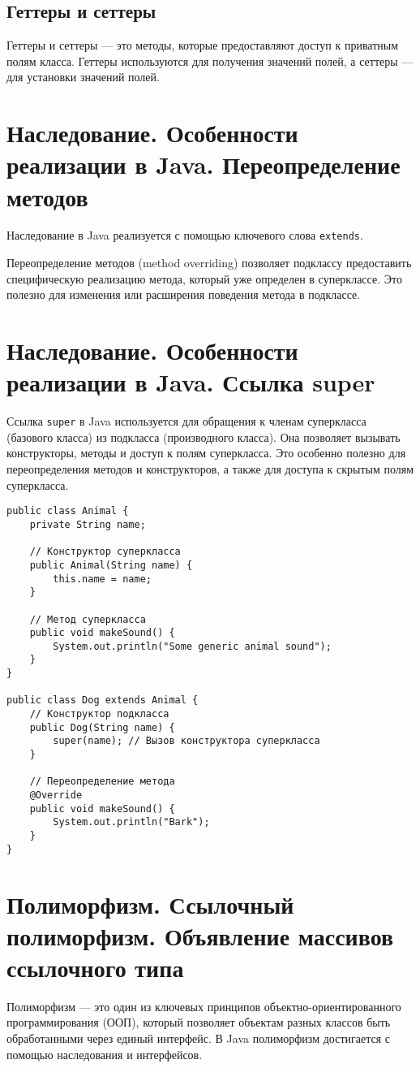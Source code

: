 \documentclass[12pt, a4paper]{article}
\begin{document}
\subsection*{Геттеры и сеттеры}
Геттеры и сеттеры — это методы, которые предоставляют доступ к приватным полям класса. Геттеры используются для получения значений полей, а сеттеры — для установки значений полей.


\section{Наследование. Особенности реализации в Java. Переопределение методов}
Наследование в Java реализуется с помощью ключевого слова \texttt{extends}.

Переопределение методов (method overriding) позволяет подклассу предоставить специфическую реализацию метода, который уже определен в суперклассе. Это полезно для изменения или расширения поведения метода в подклассе.


\section{Наследование. Особенности реализации в Java. Ссылка super}
Ссылка \texttt{super} в Java используется для обращения к членам суперкласса (базового класса) из подкласса (производного класса). Она позволяет вызывать конструкторы, методы и доступ к полям суперкласса. Это особенно полезно для переопределения методов и конструкторов, а также для доступа к скрытым полям суперкласса.

\begin{verbatim}
public class Animal {
    private String name;

    // Конструктор суперкласса
    public Animal(String name) {
        this.name = name;
    }

    // Метод суперкласса
    public void makeSound() {
        System.out.println("Some generic animal sound");
    }
}

public class Dog extends Animal {
    // Конструктор подкласса
    public Dog(String name) {
        super(name); // Вызов конструктора суперкласса
    }

    // Переопределение метода
    @Override
    public void makeSound() {
        System.out.println("Bark");
    }
}
\end{verbatim}


\section{Полиморфизм. Ссылочный полиморфизм. Объявление массивов ссылочного типа}
Полиморфизм — это один из ключевых принципов объектно-ориентированного программирования (ООП), который позволяет объектам разных классов быть обработанными через единый интерфейс. В Java полиморфизм достигается с помощью наследования и интерфейсов.
\end{document}
